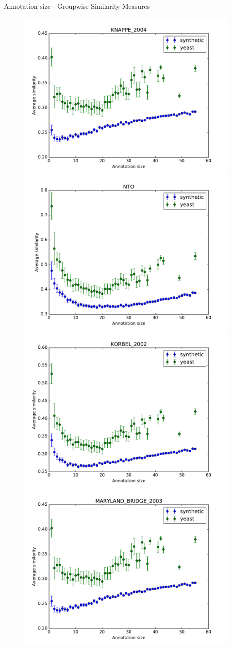\documentclass{beamer}
\begin{document}
\begin{frame}{Annotation size - Groupwise Similarity Measures}

\begin{figure}
\includegraphics[width=0.5\linewidth, height=0.4\textheight]{groupwise/SIM_FRAMEWORK_DAG_SET_KNAPPE_2004_avg.pdf}
\includegraphics[width=0.5\linewidth, height=0.4\textheight]{groupwise/SIM_GROUPWISE_DAG_NTO_avg.pdf}\\
\includegraphics[width=0.5\linewidth, height=0.4\textheight]{groupwise/SIM_FRAMEWORK_DAG_SET_KORBEL_2002_avg.pdf}
\includegraphics[width=0.5\linewidth, height=0.4\textheight]{groupwise/SIM_FRAMEWORK_DAG_SET_MARYLAND_BRIDGE_2003_avg.pdf}
\end{figure}

\end{frame}
\end{document}
